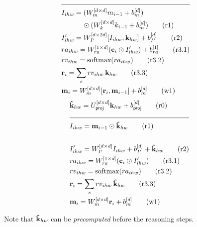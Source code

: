 \begin{multicols}{2}
	\noindent
	\begin{align*}
	\\
	\cline{1-2}
	&I_{ihw} = (W_{m}^{[d \times d]} m_{i-1} + b_{m}^{[d]}) \\
	           & \qquad \quad \odot (W_{k}^{[d \times d]} k_{i-1} + b_{m}^{[d]}) \tag{r1} \\
	&I'_{ihw} =  W_{I'}^{[d \times 2d]} [I_{ihw},\kb_{hw}]  + b_{I'}^{[d]}  \tag{r2} \\
	&ra_{ihw} = W_{ra}^{[1 \times d]} (\cc_i \odot I'_{ihw}) + b_{ra}^{[1]} \tag{r3.1}\\
	&rv_{ihw} = \textrm{softmax}(ra_{ihw}) \tag{r3.2}\\
	&\rr_i = \sum_s rv_{ihw} \, \kb_{hw}  \tag{r3.3}\\
	&\mem_i = W_{m}^{[d \times d]} [\rr_i, \mem_{i-1}]  + b_{m}^{[d]} \tag{w1}	
	\end{align*}
	\columnbreak
	\begin{align*}
	&\tkb_{hw} = U_{\textsf{proj}}^{[d \times d]} \mathbf{k}_{hw} + b_{\textsf{proj}}^{[d]} \tag{r0} \\
	\cline{1-2}
	&I_{ihw} = \mem_{i-1} \odot \tkb_{hw} \tag{r1} \\ \\
	&I'_{ihw} = W_{I'}^{[d \times d]} I_{ihw} + b_{I'}^{[d]} + \tkb_{hw} \tag{r2} \\
	&ra_{ihw} = W_{ra}^{[1 \times d]} (\cc_i \odot I'_{ihw})  \tag{r3.1}\\
	&rv_{ihw} = \textrm{softmax}(ra_{ihw}) \tag{r3.2}\\
	&\rr_i = \sum_s rv_{ihw} \, \tkb_{hw}  \tag{r3.3}\\
	&\mem_i = W_{m}^{[d \times d]} \rr_i + b_{m}^{[d]} \tag{w1}
	\end{align*}
\end{multicols}

Note that $\mathbf{\hat{k}}_{hw}$ can be \emph{precomputed} before the reasoning steps.

